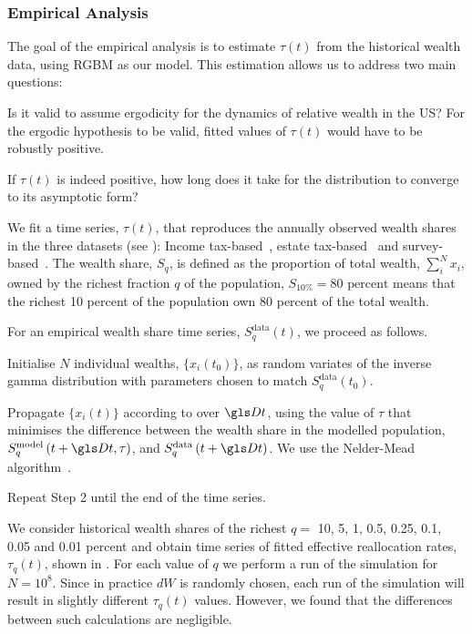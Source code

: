 \subsubsection{Empirical Analysis}\label{sec:analysis}
The goal of the empirical analysis is to estimate $\tau\left(t\right)$ from the historical wealth data, using RGBM as our model. This estimation allows us to address two main questions:

\bi
\item[1.] Is it valid to assume ergodicity for the dynamics of relative wealth in the US? For the ergodic hypothesis to be valid, fitted values of $\tau\left(t\right)$ would have to be robustly positive.
\item[2.] If $\tau\left(t\right)$ is indeed positive, how long does it take for the distribution to converge to its asymptotic form?
\ei

We fit a time series, $\tau\left(t\right)$, that reproduces the annually observed wealth shares in the three datasets (see ): Income tax-based~\cite{SaezZucman2014,WID2017}, estate tax-based~\cite{kopczuk2004top} and survey-based~\cite{bricker2016measuring2}. The wealth share, $S_q$, is defined as the proportion of total wealth, $\sum_i^N x_i$, owned by the richest fraction $q$ of the population, \eg $S_{10\%}=80 \text{ percent}$ means that the richest 10 percent of the population own 80 percent of the total wealth.

For an empirical wealth share time series, $S^{\text{data}}_q\left(t\right)$, we proceed as follows.

\bi
\item[ -- Step 1]
Initialise $N$ individual wealths, $\{x_i\left(t_0\right)\}$, as random variates of the inverse gamma distribution with parameters chosen to match $S^{\text{data}}_q\left(t_0\right)$.
\item[ -- Step 2]
Propagate $\{x_i\left(t\right)\}$ according to  over $\Dt$,
using the value of $\tau$ that minimises the difference between the wealth share in the modelled population, $S^{\text{model}}_q\left(t+\Dt, \tau\right)$, and $S^{\text{data}}_q\left(t+\Dt\right)$. We use the Nelder-Mead algorithm~\cite{NelderMead1965}.
\item[ -- Step 3]
Repeat Step 2 until the end of the time series.
\ei

We consider historical wealth shares of the richest $q=$ 10, 5, 1, 0.5, 0.25, 0.1, 0.05 and 0.01 percent and obtain time series of fitted effective reallocation rates, $\tau_q\left(t\right)$, shown in .
For each value of $q$ we perform a run of the simulation for $N=10^8$. Since in practice $dW$ is randomly chosen, each run of the simulation will result in slightly different $\tau_q\left(t\right)$ values. However, we found that the differences between such calculations are negligible. 

